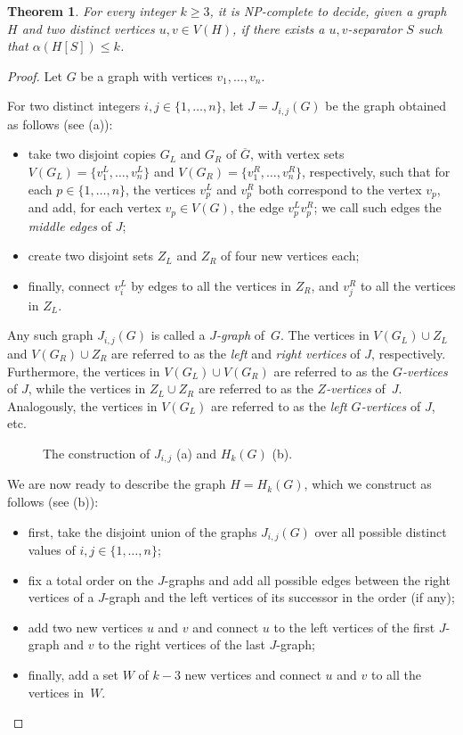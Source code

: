 \documentclass[11pt]{article}
\newtheorem{theorem}{Theorem}[section]
\theoremstyle{definition}
\newcommand{\NP}{\textup{\textsf{NP}}}
\begin{document}
\begin{theorem}\label{thm:separator}
For every integer $k\ge 3$, it is \NP-complete to decide, given a graph $H$ and two distinct vertices $u,v \in V(H)$, if there exists a $u{,}v$-separator $S$ such that $\alpha(H[S]) \leq k$.
\end{theorem}

\begin{proof}
Let $G$ be a graph with vertices $v_1, \dots, v_n$.

For two distinct integers $i,j \in \{1, \dots, n\}$, let $J = J_{i,j}(G)$
be the graph obtained as follows (see  (a)):
\begin{itemize}
    \item take two disjoint copies $G_L$ and $G_R$ of $\overline{G}$, with vertex sets $V(G_L) = \{v_1^L, \dots, v_n^L\}$ and $V(G_R) = \{v_1^R, \dots, v_n^R\}$, respectively, such that for each
    $p\in \{1, \dots, n\}$, the vertices $v_p^L$ and $v_p^R$ both correspond to the vertex $v_p$, and add, for each vertex $v_p \in V(G)$, the edge $v_p^L v_p^R$; we call such edges the \emph{middle edges} of $J$;
    \item create two disjoint sets $Z_L$ and $Z_R$ of four new vertices each;
    \item finally, connect $v_i^L$ by edges to all the vertices in $Z_R$, and $v_j^R$ to all the vertices in $Z_L$.
\end{itemize}
Any such graph $J_{i,j}(G)$ is called a \emph{$J$-graph} of~$G$.
The vertices in $V(G_L)\cup Z_L$ and $V(G_R)\cup Z_R$ are referred to as the \emph{left} and \emph{right vertices} of $J$, respectively.
Furthermore, the vertices in $V(G_L)\cup V(G_R)$ are referred to as the \emph{$G$-vertices} of $J$, while the vertices in $Z_L\cup Z_R$ are referred to as the \emph{$Z$-vertices} of~$J$.
Analogously, the vertices in $V(G_L)$ are referred to as the \emph{left $G$-vertices} of $J$, etc.

\begin{figure}[ht]
\centering
\scalebox{0.7}{

}
\caption{The construction of $J_{i,j}$ (a) and $H_k(G)$ (b).}\label{fig:GHNPc}
\end{figure}


We are now ready to describe the graph $H = H_k(G)$, which we construct as follows (see  (b)):
\begin{itemize}
    \item first, take the disjoint union of the graphs $J_{i,j}(G)$ over all possible distinct values of $i,j \in \{1, \dots, n\}$;
    \item fix a total order on the $J$-graphs and add all possible edges between the right vertices of a $J$-graph and the left vertices of its successor in the order (if any);
    \item add two new vertices $u$ and $v$ and connect $u$ to the left vertices of the first $J$-graph and $v$ to the right vertices of the last $J$-graph;
    \item finally, add a set $W$ of $k-3$ new vertices and connect $u$ and $v$ to all the vertices in~$W$.
\end{itemize}


\end{proof}
\end{document}
